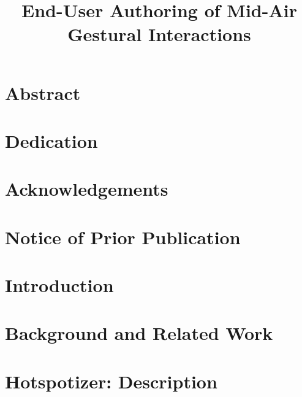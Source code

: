 \documentclass[11pt, twoside]{book}
\title{End-User Authoring of Mid-Air Gestural Interactions}
\begin{document}
\frontmatter



\clearpage
\thispagestyle{empty}
\mbox{}

\clearpage
\thispagestyle{empty}


\chapter*{Abstract}
\thispagestyle{empty}


\chapter*{Dedication}
\thispagestyle{empty}


\chapter*{Acknowledgements}
\thispagestyle{empty}


\chapter*{Notice of Prior Publication}
\thispagestyle{empty}


\setcounter{tocdepth}{1}
\tableofcontents
\thispagestyle{empty}


\mainmatter
\pagestyle{fancy}

\chapter{Introduction}
\label{chp:introduction}


\chapter{Background and Related Work}
\label{chp:background}


\chapter{Hotspotizer: Description}
\label{chp:hotspotizer}

\end{document}
